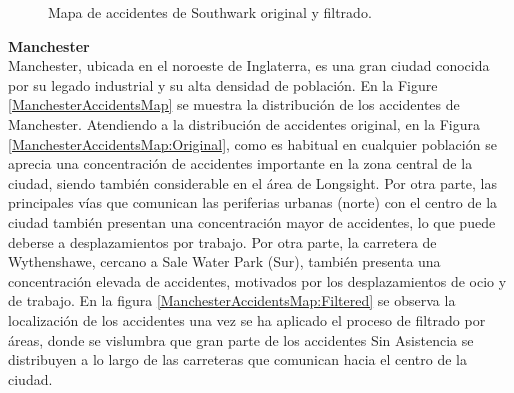 \documentclass{uathesis-es}
\begin{document}
{\begin{figure}[H]
{          \label{SouthwarkAccidentsMap:Filtered}
      }
      \caption{Mapa de accidentes de Southwark original y filtrado.}
      \label{SouthwarkAccidentsMap}
  \end{figure}


\textbf{Manchester}\\

Manchester, ubicada en el noroeste de Inglaterra, es una gran ciudad conocida por su legado industrial y su alta densidad de población. En la Figure \ref{ManchesterAccidentsMap} se muestra la distribución de los accidentes de Manchester. Atendiendo a la distribución de accidentes original, en la Figura \ref{ManchesterAccidentsMap:Original}, como es habitual en cualquier población se aprecia una concentración de accidentes importante en la zona central de la ciudad, siendo también considerable en el área de Longsight. Por otra parte, las principales vías que comunican las periferias urbanas (norte) con el centro de la ciudad también presentan una concentración mayor de accidentes, lo que puede deberse a desplazamientos por trabajo. Por otra parte, la carretera de Wythenshawe, cercano a Sale Water Park (Sur), también presenta una concentración elevada de accidentes, motivados por los desplazamientos de ocio y de trabajo. En la figura \ref{ManchesterAccidentsMap:Filtered} se observa la localización de los accidentes una vez se ha aplicado el proceso de filtrado por áreas, donde se vislumbra que gran parte de los accidentes Sin Asistencia se distribuyen a lo largo de las carreteras que comunican hacia el centro de la ciudad.


}
\end{document}
